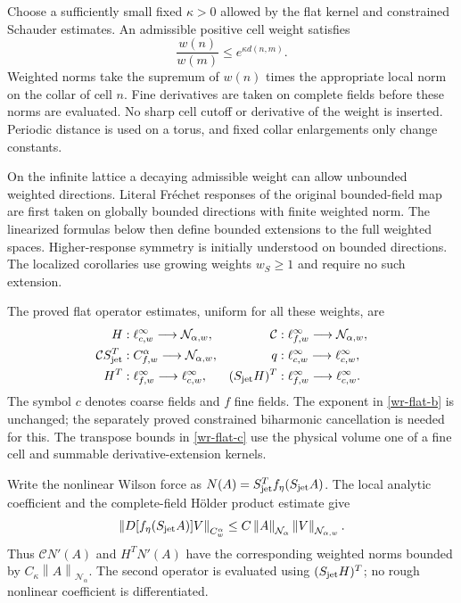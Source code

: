 \documentclass[11pt]{article}
\theoremstyle{remark}
\newcommand{\norm}[1]{\left\|#1\right\|}
\begin{document}
Choose a sufficiently small fixed $\kappa>0$ allowed by the flat
kernel and constrained Schauder estimates. An admissible positive
cell weight satisfies
\begin{equation}\label{wr-weight}
 \frac{w(n)}{w(m)}\le e^{\kappa d(n,m)}.
\end{equation}
Weighted norms take the supremum of $w(n)$ times the appropriate
local norm on the collar of cell $n$. Fine derivatives are taken
on complete fields before these norms are evaluated. No sharp cell
cutoff or derivative of the weight is inserted. Periodic distance
is used on a torus, and fixed collar enlargements only change
constants.

On the infinite lattice a decaying admissible weight can allow
unbounded weighted directions. Literal Fr\'echet responses of the
original bounded-field map are first taken on globally bounded
directions with finite weighted norm. The linearized formulas
below then define bounded extensions to the full weighted spaces.
Higher-response symmetry is initially understood on bounded
directions. The localized corollaries use growing weights
$w_S\ge1$ and require no such extension.

The proved flat operator estimates, uniform for all these weights,
are
\begin{align}
 H &: \ell^\infty_{c,w}\longrightarrow\mathcal N_{\alpha,w},&
 \mathcal C &: \ell^\infty_{f,w}\longrightarrow\mathcal N_{\alpha,w},
                                                       \label{wr-flat-a}\\
 \mathcal C S_{\rm jet}^T &: C^\alpha_{f,w}\longrightarrow\mathcal N_{\alpha,w},
 &q &: \ell^\infty_{c,w}\longrightarrow\ell^\infty_{c,w},
                                                       \label{wr-flat-b}\\
 H^T &: \ell^\infty_{f,w}\longrightarrow\ell^\infty_{c,w},&
 (S_{\rm jet}H)^T &: \ell^\infty_{f,w}\longrightarrow\ell^\infty_{c,w}.
                                                       \label{wr-flat-c}
\end{align}
The symbol $c$ denotes coarse fields and $f$ fine fields.
The exponent in \eqref{wr-flat-b} is unchanged; the separately
proved constrained biharmonic cancellation is needed for this.
The transpose bounds in \eqref{wr-flat-c} use the physical volume
one of a fine cell and summable derivative-extension kernels.

Write the nonlinear Wilson force as
$N(A)=S_{\rm jet}^Tf_\eta(S_{\rm jet}A)$. The local analytic
coefficient and the complete-field H\"older product estimate give
\begin{equation}\label{wr-force}
 \norm{D[f_\eta(S_{\rm jet}A)]V}_{C^\alpha_w}
 \le C\norm{A}_{\mathcal N_\alpha}
                   \norm{V}_{\mathcal N_{\alpha,w}}.
\end{equation}
Thus $\mathcal C N'(A)$ and $H^TN'(A)$ have the corresponding
weighted norms bounded by $C_\kappa\norm{A}_{\mathcal N_\alpha}$.
The second operator is evaluated using $(S_{\rm jet}H)^T$;
no rough nonlinear coefficient is differentiated.
\end{document}
